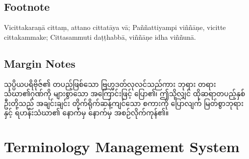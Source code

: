 \subsection{Footnote}
Vicittakaraṇā cittaṃ, attano cittatāya vā;
Paññattiyampi viññāṇe, vicitte cittakammake;
Cittasammuti daṭṭhabbā, viññāṇe idha viññunā.


\subsection{Margin Notes}
သုပ္ပိယပရိဗိုဇ်၏ တပည့်ဖြစ်သော ဗြဟ္မဒတ်လုလင်သည်ကား ဘုရား တရား သံဃာ၏ဂုဏ်ကို များစွာသော အကြောင်းဖြင့် ပြော၏၊ ဤသို့လျှင် ထိုဆရာတပည့်နှစ်ဦးတို့သည် အချင်းချင်း တိုက်ရိုက်ဆန့်ကျင်သော စကားကို ပြောလျက် မြတ်စွာဘုရားနှင့် ရဟန်းသံဃာ၏ နောက်မှ နောက်မှ အစဉ်လိုက်ကုန်၏။

\section{Terminology Management System}





\commentarytable
